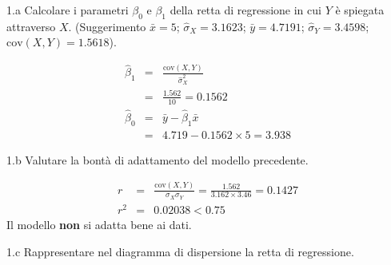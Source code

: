 \documentclass[
  11pt,
]{book}
\theoremstyle{mytheoremstyle}
\theoremstyle{mydefstyle}
\newenvironment{sol}
  {
  \begin{tcolorbox}[enhanced,breakable,arc=0.1mm,boxrule=1pt,colback=white,colframe=iblue,
  title=\bf \fontfamily{lmss}\selectfont \hspace{.5 cm} Soluzione,drop fuzzy shadow]

}{
\end{tcolorbox}
  }
\begin{document}
1.a Calcolare i parametri \(\beta_{0}\) e \(\beta_{1}\)
della retta di regressione in cui \(Y\) è spiegata attraverso \(X\).
(Suggerimento \(\bar{x} = 5\); \(\hat\sigma_{X} = 3.1623\);
\(\bar{y} = 4.7191\); \(\hat\sigma_{Y} = 3.4598\); \(\text{cov}(X,Y)= 1.5618\)).

\begin{sol}
\begin{eqnarray*}
       \hat\beta_1 &=& \frac{\text{cov}(X,Y)}{\hat\sigma_X^2} \\
            &=& \frac{ 1.562 }{ 10 }  =  0.1562 \\
      \hat\beta_0 &=& \bar y - \hat\beta_1 \bar x\\
          &=&  4.719 - 0.1562 \times  5 = 3.938 
      \end{eqnarray*}

\end{sol}

1.b Valutare la bontà di adattamento del modello precedente.

\begin{sol}
\begin{eqnarray*}
r&=&\frac{\text{cov}(X,Y)}{\sigma_X\sigma_Y}=\frac{ 1.562 }{ 3.162 \times 3.46 }= 0.1427 \\r^2&=& 0.02038 < 0.75
\end{eqnarray*}
Il modello \textbf{non} si adatta bene ai dati.

\end{sol}

1.c Rappresentare nel diagramma di dispersione la retta di regressione.
\end{document}

